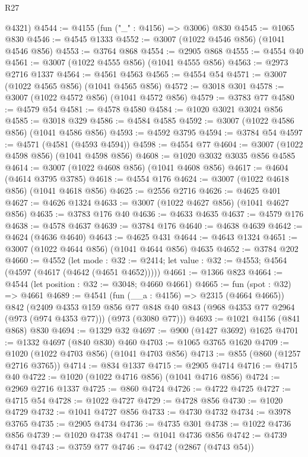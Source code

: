 \begin{lexlean}{R27}
\begin{coremodule}
      @4321)
@4544 := @4155 (fun ("_" : @4156) => @3006) @830
@4545 := @1065 @830
@4546 := @4545 @1333
@4552 := @3007 (@1022 @4546 @856) (@1041 @4546 @856)
@4553 := @3764 @868
@4554 := @2905 @868
@4555 := @4554 @40
@4561 := @3007 (@1022 @4555 @856) (@1041 @4555 @856)
@4563 := @2973 @2716 @1337
@4564 := @4561 @4563
@4565 := @4554 @54
@4571 := @3007 (@1022 @4565 @856) (@1041 @4565 @856)
@4572 := @3018 @301
@4578 := @3007 (@1022 @4572 @856) (@1041 @4572 @856)
@4579 := @3783 @77
@4580 := @4579 @54
@4581 := @4578 @4580
@4584 := @1020 @3021 @3024 @856
@4585 := @3018 @329
@4586 := @4584 @4585
@4592 := @3007 (@1022 @4586 @856) (@1041 @4586 @856)
@4593 := @4592 @3795
@4594 := @3784 @54
@4597 := @4571 (@4581 (@4593 @4594))
@4598 := @4554 @77
@4604 := @3007 (@1022 @4598 @856) (@1041 @4598 @856)
@4608 := @1020 @3032 @3035 @856 @4585
@4614 := @3007 (@1022 @4608 @856) (@1041 @4608 @856)
@4617 := @4604 (@4614 @3795 @3785)
@4618 := @4554 @176
@4624 := @3007 (@1022 @4618 @856) (@1041 @4618 @856)
@4625 := @2556 @2716
@4626 := @4625 @401
@4627 := @4626 @1324
@4633 := @3007 (@1022 @4627 @856) (@1041 @4627 @856)
@4635 := @3783 @176 @40
@4636 := @4633 @4635
@4637 := @4579 @176
@4638 := @4578 @4637
@4639 := @3784 @176
@4640 := @4638 @4639
@4642 := @4624 (@4636 @4640)
@4643 := @4625 @431
@4644 := @4643 @1324
@4651 := @3007 (@1022 @4644 @856) (@1041 @4644 @856) @4635
@4652 := @3784 @202
@4660 := @4552
    (let mode : @32 := @2414; let value : @32 := @4553; @4564 (@4597 (@4617 (@4642 (@4651 @4652)))))
@4661 := @1366 @823
@4664 := @4544 (let position : @32 := @3048; @4660 @4661)
@4665 := fun (spot : @32) => @4661
@4689 := @4541
    (fun (__a : @4156) => @2315 (@4664 @4665))
    @842
    (@2409
      @4353
      @159
      @856
      @77
      @848
      @40
      @843
      (@968 @4353 @77 @2964 (@973 (@974 @4353 @77)))
      (@973 (@3080 @77)))
@4693 := @1021 @4156 (@841 @868) @830
@4694 := @1329 @32
@4697 := @900 (@1427 @3692) @1625
@4701 := @1332 @4697 (@840 @830) @460
@4703 := @1065 @3765 @1620
@4709 := @1020 (@1022 @4703 @856) (@1041 @4703 @856)
@4713 := @855 (@860 (@1257 @2716 @3765))
@4714 := @834 @1337
@4715 := @2905 @4714
@4716 := @4715 @40
@4722 := @1020 (@1022 @4716 @856) (@1041 @4716 @856)
@4724 := @2969 @2716 @1337
@4725 := @860 @4724
@4726 := @4722 @4725
@4727 := @4715 @54
@4728 := @1022 @4727
@4729 := @4728 @856
@4730 := @1020 @4729
@4732 := @1041 @4727 @856
@4733 := @4730 @4732
@4734 := @3978 @3765
@4735 := @2905 @4734
@4736 := @4735 @301
@4738 := @1022 @4736 @856
@4739 := @1020 @4738
@4741 := @1041 @4736 @856
@4742 := @4739 @4741
@4743 := @3759 @77
@4746 := @4742 (@2867 (@4743 @54))

\end{coremodule}
\end{lexlean}
